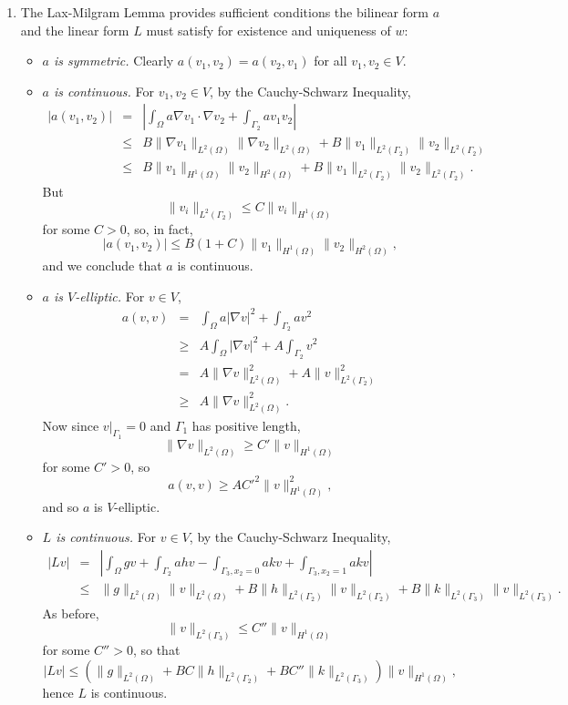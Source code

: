 \documentclass{article}
\begin{document}
\begin{enumerate}
\begin{enumerate}
\item The Lax-Milgram Lemma provides sufficient conditions the bilinear form \(a\) and the linear form \(L\) must satisfy for existence and uniqueness of \(w\):

\begin{itemize}
\item {\em \(a\) is symmetric.}  Clearly \(a(v_1,v_2) = a(v_2,v_1)\) for all \(v_1,v_2 \in V\).

\item {\em \(a\) is continuous.} For \(v_1,v_2 \in V\), by the Cauchy-Schwarz Inequality,
\begin{eqnarray*}
|a(v_1,v_2)| &   =  & \left| \int_{\Omega} a \nabla v_1 \cdot \nabla v_2 + \int_{\Gamma_2} a v_1 v_2 \right| \\
             & \leq & B \|\nabla v_1\|_{L^2(\Omega)} \|\nabla v_2\|_{L^2(\Omega)} + B \|v_1\|_{L^2(\Gamma_2)} \|v_2\|_{L^2(\Gamma_2)} \\
             & \leq & B \|v_1\|_{H^1(\Omega)} \|v_2\|_{H^2(\Omega)} + B \|v_1\|_{L^2(\Gamma_2)} \|v_2\|_{L^2(\Gamma_2)}.
\end{eqnarray*}
But
\[\|v_i\|_{L^2(\Gamma_2)} \leq C \|v_i\|_{H^1(\Omega)}\]
for some \(C > 0\), so, in fact,
\[|a(v_1,v_2)| \leq B(1 + C) \|v_1\|_{H^1(\Omega)} \|v_2\|_{H^2(\Omega)},\]
and we conclude that \(a\) is continuous.

\item {\em \(a\) is \(V\)-elliptic.}  For \(v \in V\),
\begin{eqnarray*}
a(v,v) &   =  & \int_{\Omega} a |\nabla v|^2 + \int_{\Gamma_2} a v^2 \\
       & \geq & A \int_{\Omega} |\nabla v|^2 + A \int_{\Gamma_2} v^2 \\
       &   =  & A \|\nabla v\|_{L^2(\Omega)}^2 + A \|v\|_{L^2(\Gamma_2)}^2 \\
       & \geq & A \|\nabla v\|_{L^2(\Omega)}^2.
\end{eqnarray*}
Now since \(v|_{\Gamma_1} = 0\) and \(\Gamma_1\) has positive length,
\[\|\nabla v\|_{L^2(\Omega)} \geq C' \|v\|_{H^1(\Omega)}\]
for some \(C' > 0\), so
\[a(v,v) \geq A C'^2 \|v\|_{H^1(\Omega)}^2,\]
and so \(a\) is \(V\)-elliptic.

\item {\em \(L\) is continuous.}  For \(v \in V\), by the Cauchy-Schwarz Inequality,
\begin{eqnarray*}
|Lv| &   =  & \left| \int_{\Omega} g v + \int_{\Gamma_2} a h v - \int_{\Gamma_3, x_2 = 0} a k v + \int_{\Gamma_3, x_2 = 1} a k v \right| \\
     & \leq & \|g\|_{L^2(\Omega)} \|v\|_{L^2(\Omega)} + B \|h\|_{L^2(\Gamma_2)} \|v\|_{L^2(\Gamma_2)} + B \|k\|_{L^2(\Gamma_3)} \|v\|_{L^2(\Gamma_3)}.
\end{eqnarray*}
As before,
\[\|v\|_{L^2(\Gamma_3)} \leq C'' \|v\|_{H^1(\Omega)}\]
for some \(C'' > 0\), so that
\[|Lv| \leq \left( \|g\|_{L^2(\Omega)} + B C \|h\|_{L^2(\Gamma_2)} + B C'' \|k\|_{L^2(\Gamma_3)} \right) \|v\|_{H^1(\Omega)},\]
hence \(L\) is continuous.


\end{itemize}
\end{enumerate}
\end{enumerate}
\end{document}

